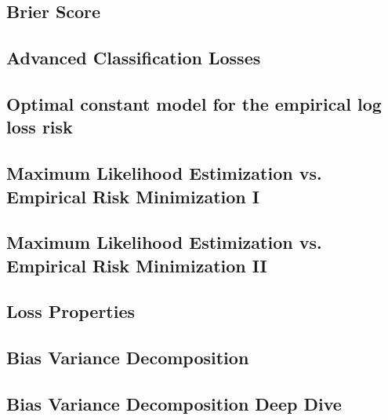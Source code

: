\subsection{Brier Score}


\subsection{Advanced Classification Losses}


\subsection{Optimal constant model for the empirical log loss risk}


\subsection{Maximum Likelihood Estimization vs. Empirical Risk Minimization I}


\subsection{Maximum Likelihood Estimization vs. Empirical Risk Minimization II}


\subsection{Loss Properties}


\subsection{Bias Variance Decomposition}


\subsection{Bias Variance Decomposition Deep Dive}

